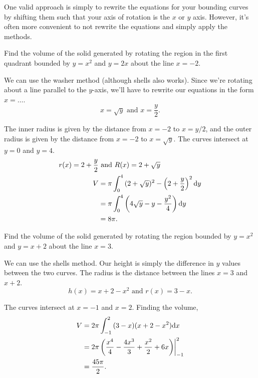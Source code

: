 One valid approach is simply to rewrite the equations for your bounding curves by shifting them such that your axis of rotation is the $x$ or $y$ axis.
However, it's often more convenient to not rewrite the equations and simply apply the methods.

\begin{example}
	Find the volume of the solid generated by rotating the region in the first quadrant bounded by $y=x^2$ and $y=2x$ about the line $x=-2$.
\end{example}
\begin{answer}
	We can use the washer method (although shells also works).
	Since we're rotating about a line parallel to the $y$-axis, we'll have to rewrite our equations in the form $x=\ldots$.
	\begin{equation*}
		x = \sqrt{y} \text{ and } x = \frac{y}{2}.
	\end{equation*}
	
	The inner radius is given by the distance from $x=-2$ to $x=y/2$, and the outer radius is given by the distance from $x=-2$ to $x=\sqrt{y}$.
	The curves intersect at $y=0$ and $y=4$.
	\begin{align*}
		r(x) = 2 + \frac{y}{2} &\text{ and } R(x) = 2 + \sqrt{y} \\
		V &= \pi\int_{0}^{4}{(2+\sqrt{y})^2-\left(2+\frac{y}{2}\right)^2\mathrm{d} y} \\
		&= \pi\int_{0}^{4}{\left(4\sqrt{y}-y-\frac{y^2}{4}\right)\mathrm{d} y} \\
		&= 8\pi.
	\end{align*}
\end{answer}

\begin{example}
	Find the volume of the solid generated by rotating the region bounded by $y=x^2$ and $y=x+2$ about the line $x=3$.
\end{example} 
\begin{answer}
	We can use the shells method.
	Our height is simply the difference in $y$ values between the two curves.
	The radius is the distance between the lines $x=3$ and $x+2$.
	\begin{equation*}
		h(x) = x+2-x^2 \text{ and } r(x) = 3-x.
	\end{equation*}
	
	The curves intersect at $x=-1$ and $x=2$.
	Finding the volume,
	\begin{align*}
		V &= 2\pi\int_{-1}^{2}{(3-x)(x+2-x^2)\mathrm{d} x} \\
		&= 2\pi\left(\frac{x^4}{4}-\frac{4x^3}{3}+\frac{x^2}{2}+6x\right)\biggr\rvert_{-1}^{2} \\
		&= \frac{45\pi}{2}.
	\end{align*}
\end{answer}

